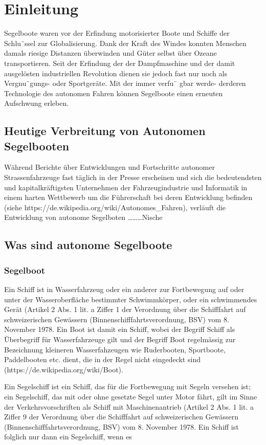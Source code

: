 
\chapter{Einleitung }
\label{chap:einleitung}
Segelboote waren vor der Erfindung motorisierter Boote und Schiffe der Schlu¨ssel zur Globalisierung. Dank der Kraft des Windes konnten Menschen damals riesige Distanzen überwinden und Güter selbst über Ozeane transportieren. Seit der Erfindung der der Dampfmaschine und der damit ausgelösten industriellen Revolution dienen sie jedoch fast nur noch als Vergnu¨gungs- oder Sportgeräte. Mit der immer verfu¨ gbar werde- derderen Technologie des autonomen Fahren können Segelboote einen erneuten Aufschwung erleben.


\section{Heutige Verbreitung von Autonomen Segelbooten}
Während Berichte über Entwicklungen und Fortschritte autonomer Strassenfahrzeuge fast täglich in der Presse erscheinen und sich die bedeutendsten und kapitalkräftigsten Unternehmen der Fahrzeugindustrie und Informatik in einem harten Wettbewerb um die Führerschaft bei deren Entwicklung befinden (siehe https://de.wikipedia.org/wiki/Autonomes\_Fahren), verläuft die Entwicklung von autonome Segelboten ………Nische 

\section{Was sind autonome Segelboote}
\subsection{Segelboot}
Ein Schiff ist in Wasserfahrzeug oder ein anderer zur Fortbewegung auf oder unter der Wasseroberfläche bestimmter Schwimmkörper, oder ein schwimmendes Gerät (Artikel 2 Abs. 1 lit. a Ziffer 1 der Verordnung über die Schifffahrt auf schweizerischen Gewässern (Binnenschifffahrtsverordnung, BSV) vom 8. November 1978. Ein Boot ist damit ein Schiff, wobei der Begriff Schiff als Überbegriff für Wasserfahrzeuge gilt und der Begriff Boot regelmässig zur Bezeichnung kleineren Wasserfahzeugen wie Ruderbooten, Sportboote, Paddelbooten etc. dient, die in der Regel nicht eingedeckt sind (https://de.wikipedia.org/wiki/Boot). 

Ein Segelschiff ist ein Schiff, das für die Fortbewegung mit Segeln versehen ist; ein Segelschiff, das mit oder ohne gesetzte Segel unter Motor fährt, gilt im Sinne der Verkehrsvorschriften als Schiff mit Maschinenantrieb (Artikel 2 Abs. 1 lit. a Ziffer 9 der Verordnung über die Schifffahrt auf schweizerischen Gewässern (Binnenschifffahrtsverordnung, BSV) vom 8. November 1978. Ein Schiff ist folglich nur dann ein Segelschiff, wenn es 

